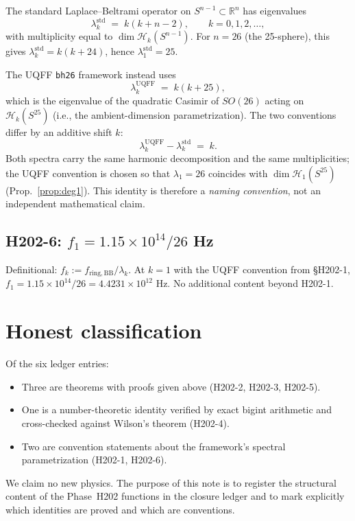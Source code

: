 \documentclass[11pt,letterpaper]{article}
\begin{document}
The standard Laplace--Beltrami operator on $S^{n-1}\subset\mathbb{R}^{n}$ has
eigenvalues
\[
\lambda_k^{\mathrm{std}} \;=\; k(k+n-2), \qquad k = 0,1,2,\ldots,
\]
with multiplicity equal to $\dim\mathcal{H}_k(S^{n-1})$. For $n=26$ (the
25-sphere), this gives $\lambda_k^{\mathrm{std}} = k(k+24)$, hence
$\lambda_1^{\mathrm{std}} = 25$.

The UQFF \texttt{bh26} framework instead uses
\[
\lambda_k^{\mathrm{UQFF}} \;=\; k(k+25),
\]
which is the eigenvalue of the quadratic Casimir of $SO(26)$ acting on
$\mathcal{H}_k(S^{25})$ (i.e., the ambient-dimension parametrization). The two
conventions differ by an additive shift $k$:
\[
\lambda_k^{\mathrm{UQFF}} - \lambda_k^{\mathrm{std}} \;=\; k.
\]
Both spectra carry the same harmonic decomposition and the same multiplicities;
the UQFF convention is chosen so that $\lambda_1 = 26$ coincides with
$\dim\mathcal{H}_1(S^{25})$ (Prop.~\ref{prop:deg1}). This identity is therefore
a \emph{naming convention}, not an independent mathematical claim.

\subsection{H202-6: $f_1 = 1.15\times 10^{14}/26$ Hz}

Definitional: $f_k := f_{\mathrm{ring,BB}}/\lambda_k$. At $k=1$ with the UQFF
convention from \S{}H202-1, $f_1 = 1.15\times 10^{14}/26 = 4.4231\times 10^{12}$
Hz. No additional content beyond H202-1.

\section{Honest classification}

Of the six ledger entries:
\begin{itemize}
  \item Three are theorems with proofs given above (H202-2, H202-3,
        H202-5).
  \item One is a number-theoretic identity verified by exact bigint
        arithmetic and cross-checked against Wilson's theorem (H202-4).
  \item Two are convention statements about the framework's spectral
        parametrization (H202-1, H202-6).
\end{itemize}

We claim no new physics. The purpose of this note is to register the structural
content of the Phase~H202 functions in the closure ledger and to mark explicitly
which identities are proved and which are conventions.
\end{document}
